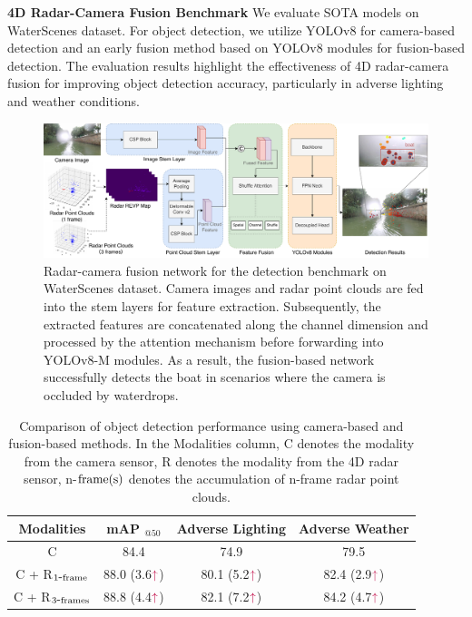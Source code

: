 \documentclass[final]{beamer}
\newlength{\colwidthB}
\begin{document}
\begin{frame}[t]
\begin{columns}
\begin{column}[T]{\colwidthB}
   \begin{block}{\Large{\textbf{4D Radar-Camera Fusion Benchmark}}}
\vspace{0.5cm}
\large
We evaluate SOTA models on WaterScenes dataset. 
For object detection, we utilize YOLOv8 for camera-based detection and an early fusion method based on YOLOv8 modules for fusion-based detection. 
The evaluation results highlight the effectiveness of 4D radar-camera fusion for improving object detection accuracy, particularly in adverse lighting and weather conditions. 


\begin{figure}
\includegraphics[width=1\textwidth]{images/network.pdf}
\caption{Radar-camera fusion network for the detection benchmark on WaterScenes dataset. Camera images and radar point clouds are fed into the stem layers for feature extraction. Subsequently, the extracted features are concatenated along the channel dimension and processed by the attention mechanism before forwarding into YOLOv8-M modules. As a result, the fusion-based network successfully detects the boat in scenarios where the camera is occluded by waterdrops.}
\end{figure}

\vspace{-0.7cm}
\begin{table}[!h]
\caption{Comparison of object detection performance using camera-based and fusion-based methods. In the Modalities column, C denotes the modality from the camera sensor, R denotes the modality from the 4D radar sensor, n-$\textup{frame(s)}$ denotes the accumulation of n-frame radar point clouds.}
\vspace{-0.5cm}
\setlength\tabcolsep{21pt}
\large
\begin{tabular}{c|ccc}
\toprule
\bf{Modalities} & \bf{mAP $_{@50}$} & \bf{Adverse Lighting} & \bf{Adverse Weather}\\\midrule
C & 84.4 & 74.9 & 79.5\\
C + R$_{1\mbox{-}\textup{frame}}$ & 88.0 (3.6$\color{purple}{\uparrow}$) & 80.1 (5.2$\color{purple}{\uparrow}$) & 82.4 (2.9$\color{purple}{\uparrow}$)\\
C + R$_{3\mbox{-}\textup{frames}}$ & 88.8 (4.4$\color{purple}{\uparrow}$) & 82.1 (7.2$\color{purple}{\uparrow}$) & 84.2 (4.7$\color{purple}{\uparrow}$)\\
\bottomrule
\end{tabular}
\end{table}


\end{block}
\end{column}
\end{columns}
\end{frame}
\end{document}

